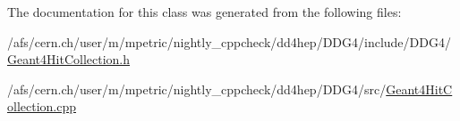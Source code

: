 The documentation for this class was generated from the following files:\begin{DoxyCompactItemize}
\item 
/afs/cern.ch/user/m/mpetric/nightly\_\-cppcheck/dd4hep/DDG4/include/DDG4/\hyperlink{_geant4_hit_collection_8h}{Geant4HitCollection.h}\item 
/afs/cern.ch/user/m/mpetric/nightly\_\-cppcheck/dd4hep/DDG4/src/\hyperlink{_geant4_hit_collection_8cpp}{Geant4HitCollection.cpp}\end{DoxyCompactItemize}
